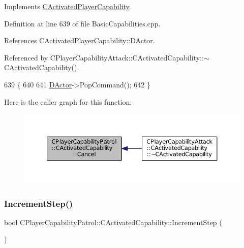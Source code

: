 Implements \hyperlink{classCActivatedPlayerCapability_a5cde83be468e262ad054d81e28684a81}{C\+Activated\+Player\+Capability}.



Definition at line 639 of file Basic\+Capabilities.\+cpp.



References C\+Activated\+Player\+Capability\+::\+D\+Actor.



Referenced by C\+Player\+Capability\+Attack\+::\+C\+Activated\+Capability\+::$\sim$\+C\+Activated\+Capability().


\begin{DoxyCode}
639                                                         \{
640 
641     \hyperlink{classCActivatedPlayerCapability_a54ca944b47bff2718330639941d402b0}{DActor}->PopCommand();
642 \}
\end{DoxyCode}
Here is the caller graph for this function\+:\nopagebreak
\begin{figure}[H]
\begin{center}
\leavevmode
\includegraphics[width=350pt]{classCPlayerCapabilityPatrol_1_1CActivatedCapability_a36165c232eb283ce4a92bd4606480c73_icgraph}
\end{center}
\end{figure}
\hypertarget{classCPlayerCapabilityPatrol_1_1CActivatedCapability_a576a71646225c0723a0ed9e77add01fd}{}\label{classCPlayerCapabilityPatrol_1_1CActivatedCapability_a576a71646225c0723a0ed9e77add01fd} 
\subsubsection{\texorpdfstring{Increment\+Step()}{IncrementStep()}}
{\footnotesize\ttfamily bool C\+Player\+Capability\+Patrol\+::\+C\+Activated\+Capability\+::\+Increment\+Step (\begin{DoxyParamCaption}{ }\end{DoxyParamCaption})\hspace{0.3cm}{\ttfamily [virtual]}}




